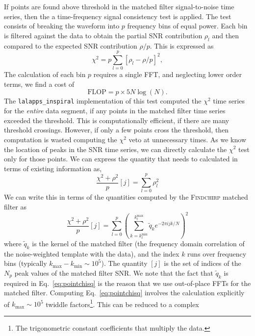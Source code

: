 If points are found above threshold in the matched filter signal-to-noise time
series, then the a time-frequency signal consistency test is applied.  The test
consists of breaking the waveform into $p$ frequency bins of equal power. Each
bin is filtered against the data to obtain the partial SNR contribution
$\rho_l$ and then compared to the expected SNR contribution $\rho / p$. This
is expressed as
\begin{equation}
 \chi^2 = p \sum_{l=0}^{p} [\rho_l - \rho / p]^2,
\end{equation}
The calculation of each bin $p$ requires a single FFT, and
neglecting lower order terms, we find a cost of
\begin{equation}
\textrm{FLOP} = p \times 5N \log(N).
\end{equation}
The \texttt{lalapps\_inspiral} implementation of this test computed the $\chi^2$
time series for the \emph{entire} data segment, if any points in the matched
filter time series exceeded the threshold. This is computationally efficient, if
there are many threshold crossings. However, if only a few points cross the
threshold, then computation is wasted computing the $\chi^2$ veto at
unnecessary times. As we know the location of peaks in the SNR time series, we
can directly calculate the $\chi^2$ test only for those points. We can express
the quantity that needs to calculated in terms of existing information as,
\begin{equation}
\frac{\chi^2 + \rho^2}{p}[j] = \sum_{l=0}^{p}\rho_l^2
\end{equation}
We can write this in terms of the quantities computed by the
\textsc{Findchirp} matched filter as
\begin{equation}
\frac{\chi^2 + \rho^2}{p}[j] = \sum_{l=0}^{p}\left(\sum_{k=k^\mathrm{min}_l}^{k^\mathrm{max}_l}\tilde{q}_k e^{-2\pi i jk/N}\right)^2
\label{eq:pointchisq}
\end{equation}
where $\tilde{q}_k$ is the kernel of the matched filter (the frequency domain
correlation of the noise-weighted template with the data), and the index $k$
runs over frequency bins (typically $k_\mathrm{max} - k_\mathrm{min} \sim
10^5$). The quantity $[j]$ is the set of indices of the $N_p$ peak values of the matched filter SNR. We note that the fact that $\tilde{q}_k$  is required in Eq.~\ref{eq:pointchisq} is the reason that we use out-of-place FFTs for the matched filter.
Computing Eq.~\ref{eq:pointchisq}  involves
the calculation explicitly of $k_\mathrm{max} \sim 10^5$ twiddle factors\footnote{The trigonometric constant coefficients that multiply the data.}. This can be reduced to a complex

